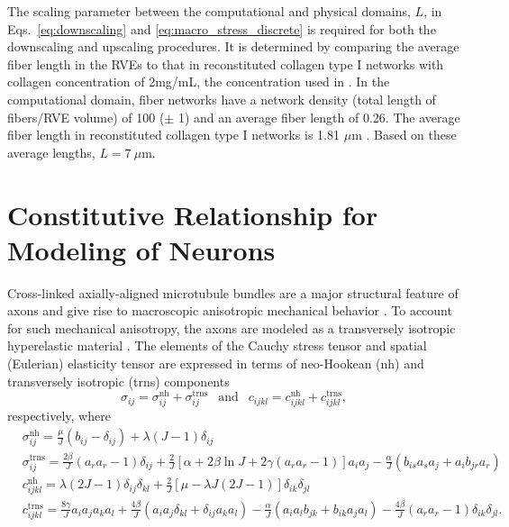 \documentclass[]{interact}
\begin{document}
The scaling parameter between the computational and physical domains, $L$, in Eqs.\ \eqref{eq:downscaling} and \eqref{eq:macro_stress_discrete} is required for both the downscaling and upscaling procedures. It is determined by comparing the average fiber length in the RVEs to that in reconstituted collagen type I networks \citep{Lindstrom:2013gd} with collagen concentration of 2mg/mL, the concentration used in \citep{Zhang:2016ga}. In the computational domain, fiber networks have a network density (total length of fibers/RVE volume) of 100 ($\pm$ 1) and an average fiber length of 0.26. The average fiber length in reconstituted collagen type I networks is 1.81 $\mu$m \citep{Lindstrom:2013gd}. Based on these average lengths, $L=7 \ \mu$m.

\section{Constitutive Relationship for Modeling of Neurons}
Cross-linked axially-aligned microtubule bundles are a major structural feature of axons and give rise to macroscopic anisotropic mechanical behavior \citep{Peter:2012fc}. To account for such mechanical anisotropy, the axons are modeled as a transversely isotropic hyperelastic material \citep{JavierBonet:2008uxa,Bonet:1998vc}. The elements of the Cauchy stress tensor and spatial (Eulerian) elasticity tensor are expressed in terms of neo-Hookean (nh) and transversely isotropic (trns) components \citep{Bonet:1998vc}
%
\begin{equation}
\sigma_{ij} = \sigma^{\text{nh}}_{ij} + \sigma^{\text{trns}}_{ij} \ \ \text{ and } \ \ c_{ijkl} = c^{\text{nh}}_{ijkl} + c^{\text{trns}}_{ijkl},
\end{equation}
%
respectively, where 
%
\begin{align}
&\sigma^{\text{nh}}_{ij} = \frac{\mu}{J}(b_{ij} - \delta_{ij}) + \lambda(J-1)\delta_{ij} \nonumber\\
%
&\sigma^{\text{trns}}_{ij} = \frac{2\beta}{J}(a_r a_r - 1)\delta_{ij} + \frac{2}{J}[\alpha+2\beta\ln J+2\gamma(a_r a_r -1)]a_i a_j - \frac{\alpha}{J}(b_{is}a_s a_j+a_i b_{jr}a_r) \nonumber\\
%
&c^{\text{nh}}_{ijkl} = \lambda(2J-1)\delta_{ij}\delta_{kl} + \frac{2}{J}[\mu - \lambda J(2J-1)]\delta_{ik}\delta_{jl} \nonumber\\
%
&c^{\text{trns}}_{ijkl} = \frac{8\gamma}{J}a_i a_j a_k a_l + \frac{4\beta}{J}(a_i a_j \delta_{kl} + \delta_{ij}a_k a_l) - \frac{\alpha}{J}(a_i a_l b_{jk} + b_{ik}a_j a_l) - \frac{4\beta}{J}(a_r a_r - 1)\delta_{ik}\delta_{jl}.
\label{eq:trns_iso}
\end{align}
\end{document}
